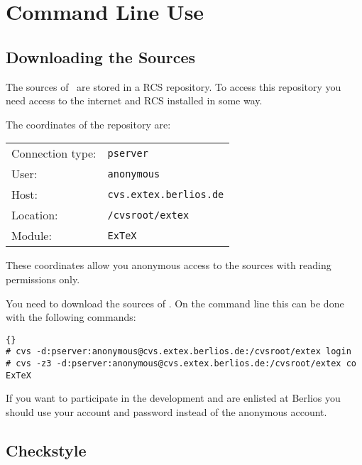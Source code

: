 \section{Command Line Use}


\subsection{Downloading the Sources}


The sources of \ExTeX\ are stored in a RCS repository. To access this
repository you need access to the internet and RCS installed in some
way.

The coordinates of the repository are:\medskip

\begin{tabular}{ll}\toprule
  Connection type: & \texttt{pserver}			\\
  User:		   & \texttt{anonymous}			\\
  Host:		   & \texttt{cvs.extex.berlios.de}	\\
  Location:	   & \texttt{/cvsroot/extex}		\\
  Module:	   & \texttt{ExTeX}			\\\bottomrule
\end{tabular}\medskip

These coordinates allow you anonymous access to the sources with
reading permissions only.

You need to download the sources of \ExTeX. On the command line this
can be done with the following commands:

\begin{lstlisting}{}
# cvs -d:pserver:anonymous@cvs.extex.berlios.de:/cvsroot/extex login
# cvs -z3 -d:pserver:anonymous@cvs.extex.berlios.de:/cvsroot/extex co ExTeX
\end{lstlisting}{}

If you want to participate in the development and are enlisted at
Berlios you should use your account and password instead of the
anonymous account.


\subsection{Checkstyle}

